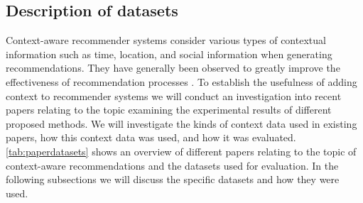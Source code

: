 \subsection{Description of datasets}
Context-aware recommender systems consider various types of contextual information such as time, location, and social information when generating recommendations.
They have generally been observed to greatly improve the effectiveness of recommendation processes \cite{aggarwal2016recommender}.
To establish the usefulness of adding context to recommender systems we will conduct an investigation into recent papers relating to the topic examining the experimental results of different proposed methods.
We will investigate the kinds of context data used in existing papers, how this context data was used, and how it was evaluated.
\autoref{tab:paperdatasets} shows an overview of different papers relating to the topic of context-aware recommendations and the datasets used for evaluation.
In the following subsections we will discuss the specific datasets and how they were used.

